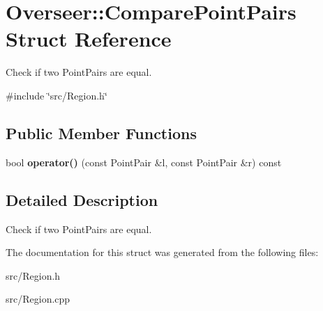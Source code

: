 \hypertarget{structOverseer_1_1ComparePointPairs}{}\section{Overseer\+:\+:Compare\+Point\+Pairs Struct Reference}
\label{structOverseer_1_1ComparePointPairs}


Check if two Point\+Pairs are equal.  




{\ttfamily \#include \char`\"{}src/\+Region.\+h\char`\"{}}

\subsection*{Public Member Functions}
\begin{DoxyCompactItemize}
\item 
\mbox{\label{structOverseer_1_1ComparePointPairs_af1ed2bea0a172be041e22959e6b3f031}} 
bool {\bfseries operator()} (const Point\+Pair \&l, const Point\+Pair \&r) const
\end{DoxyCompactItemize}


\subsection{Detailed Description}
Check if two Point\+Pairs are equal. 

The documentation for this struct was generated from the following files\+:\begin{DoxyCompactItemize}
\item 
src/Region.\+h\item 
src/Region.\+cpp\end{DoxyCompactItemize}

